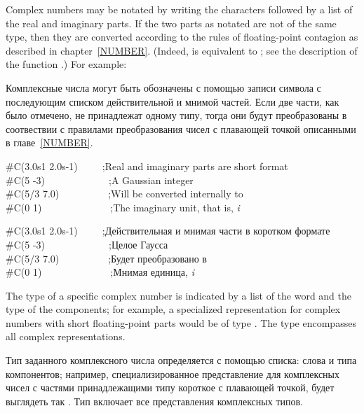 Complex numbers may be notated by writing the characters 
followed by a list of the real and imaginary parts.
If the two parts as notated are not of the same type, then
they are converted according to the rules of floating-point contagion
as described in chapter~\ref{NUMBER}.
(Indeed,  is equivalent to ;
see the description of the function .)
For example:

Комплексные числа могут быть обозначены с помощью записи символа  с
последующим списком действительной и мнимой частей.
Если две части, как было отмечено, не принадлежат одному типу, тогда они будут
преобразованы в соотвествии с правилами преобразования чисел с плавающей точкой
описанными в главе~\ref{NUMBER}.
\begin{lisp}
\#C(3.0s1 2.0s-1)~~~~~;\textrm{Real and imaginary parts are short format}\\
\#C(5 -3)~~~~~~~~~~~~~;\textrm{A Gaussian integer} \\
\#C(5/3 7.0)~~~~~~~~~~;\textrm{Will be converted internally to } \\
\#C(0 1)~~~~~~~~~~~~~~;\textrm{The imaginary unit, that is, \emph{i}}
\end{lisp}

\begin{lisp}
\#C(3.0s1 2.0s-1)~~~~~;\textrm{Действительная и мнимая части в коротком формате}\\
\#C(5 -3)~~~~~~~~~~~~~;\textrm{Целое Гаусса} \\
\#C(5/3 7.0)~~~~~~~~~~;\textrm{Будет преобразовано в } \\
\#C(0 1)~~~~~~~~~~~~~~;\textrm{Мнимая единица, \emph{i}}
\end{lisp}

The type of a specific complex number is indicated by a list
of the word  and the type of the components; for example,
a specialized representation for complex numbers with short floating-point
parts would be of type .  The type 
encompasses all complex representations.

Тип заданного комплексного числа определяется с помощью списка: слова
 и типа компонентов; например, специализированное представление для
комплексных чисел с частями принадлежащими типу короткое с плавающей точкой,
будет выглядеть так . Тип  включает все
представления комплексных типов.

